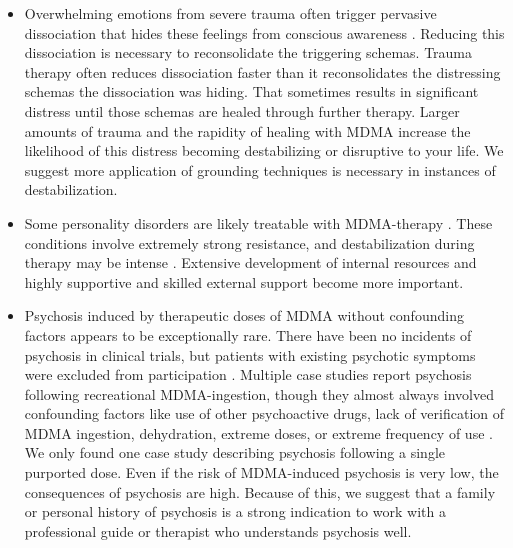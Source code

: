 \documentclass[12pt,letterpaper]{article}
\begin{document}
\begin{itemize}
    \item Overwhelming emotions from severe trauma often trigger pervasive dissociation that hides these feelings from conscious awareness \cite{razviPSIP}. Reducing this dissociation is necessary to reconsolidate the triggering schemas. Trauma therapy often reduces dissociation faster than it reconsolidates the distressing schemas the dissociation was hiding. That sometimes results in significant distress until those schemas are healed through further therapy. Larger amounts of trauma and the rapidity of healing with MDMA increase the likelihood of this distress becoming destabilizing or disruptive to your life. We suggest more application of grounding techniques is necessary in instances of destabilization.   
    \item Some personality disorders are likely treatable with MDMA-therapy \cite{traynorBorderline}. These conditions involve extremely strong resistance, and destabilization during therapy may be intense \cite{razviPSIP}. Extensive development of internal resources and highly supportive and skilled external support become more important.
    \item Psychosis induced by therapeutic doses of MDMA without confounding factors appears to be exceptionally rare. There have been no incidents of psychosis in clinical trials, but patients with existing psychotic symptoms were excluded from participation \cite{smithSystematic,mitchellMDMAClinicalTrial2}. Multiple case studies report psychosis following recreational MDMA-ingestion, though they almost always involved confounding factors like use of other psychoactive drugs, lack of verification of MDMA ingestion, dehydration, extreme doses, or extreme frequency of use \cite{mcguirePsychosis,patelPsychosis,vaivaPsychosis}. We only found one case study describing psychosis following a single purported dose. Even if the risk of MDMA-induced psychosis is very low, the consequences of psychosis are high. Because of this, we suggest that a family or personal history of psychosis is a strong indication to work with a professional guide or therapist who understands psychosis well. 

\end{itemize}
\end{document}
